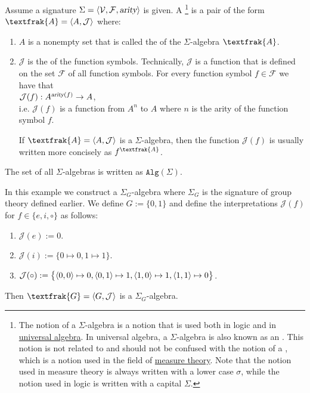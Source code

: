 \begin{Definition}
  Assume a signature $\Sigma = \langle \mathcal{V}, \mathcal{F}, \textsl{arity} \rangle$ is given.  A
  \footnote{
    The notion of a $\Sigma$-algebra is a notion that is used both in logic and in
    \href{https://en.wikipedia.org/wiki/Universal_algebra}{universal algebra}.  In universal algebra, a
    $\Sigma$-algebra is also known as an .  This notion is not related to and should
    not be confused with the notion of a , which is a notion used in the field of
    \href{https://en.wikipedia.org/wiki/Measure_(mathematics)}{measure theory}.  Note that the notion used in
    measure theory is always written with a lower case $\sigma$, while the notion used in logic is written with
    a capital $\Sigma$. 
  } is a pair of the form $\textfrak{A} = \pair(A, \mathcal{J})$ where:
  \begin{enumerate}
  \item $A$ is a nonempty set that is called the  of the $\Sigma$-algebra $\textfrak{A}$.
  \item $\mathcal{J}$ is the  of the function symbols.  Technically, $\mathcal{J}$ is a
        function that is defined on the set $\mathcal{F}$ of all function symbols.  For every function symbol
        $f \in \mathcal{F}$ we have that 
        \\[0.2cm]
        \hspace*{1.3cm}
        $\mathcal{J}(f): A^{\textsl{arity}(f)} \rightarrow A$, 
        \\[0.2cm]
        i.e. $\mathcal{J}(f)$ is a function from $A^n$ to $A$ where $n$ is the arity of the function symbol
        $f$.

        If $\textfrak{A} = \pair(A, \mathcal{J})$ is a $\Sigma$-algebra, then the function $\mathcal{J}(f)$ is 
        usually written more concisely as $f^\textfrak{A}$. 
  \end{enumerate}
  The set of all $\Sigma$-algebras is written as $\mathtt{Alg}(\Sigma)$. \eoxs
\end{Definition}

\example
In this example we construct a $\Sigma_G$-algebra where $\Sigma_G$ is the signature of group theory defined
earlier.  We define $G := \{ 0, 1 \}$ and define the interpretations $\mathcal{J}(f)$ for $f \in \{e, i, \circ
\}$ as follows:
\begin{enumerate}
\item $\mathcal{J}(e) := 0$.
\item $\mathcal{J}(i) := \bigl\{ 0 \mapsto 0, 1 \mapsto 1 \bigr\}$.
\item $\mathcal{J}(\circ) := \bigl\{ \pair(0,0) \mapsto 0,
                                    \pair(0,1) \mapsto 1,
                                    \pair(1,0) \mapsto 1,
                                    \pair(1,1) \mapsto 0
                            \bigr\}$.
\end{enumerate}
Then $\textfrak{G} = \pair(G, \mathcal{J})$ is a $\Sigma_G$-algebra.  \eoxs

